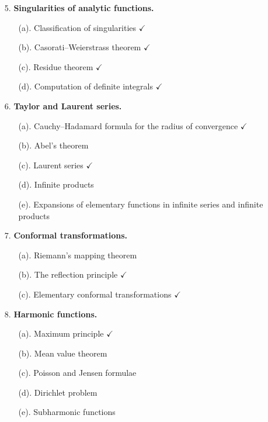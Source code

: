 \documentclass[11pt,a4paper]{article}
\theoremstyle{definition}
\begin{document}
\begin{enumerate}
\item[5.] \textbf{Singularities of analytic functions.}
  \begin{enumerate}
  \item[(a).] Classification of singularities $\checkmark$
  \item[(b).] Casorati--Weierstrass theorem $\checkmark$
  \item[(c).] Residue theorem $\checkmark$
  \item[(d).] Computation of definite integrals $\checkmark$
  \end{enumerate}

\item[6.] \textbf{Taylor and Laurent series.}
  \begin{enumerate}
  \item[(a).] Cauchy--Hadamard formula for the radius of convergence $\checkmark$
  \item[(b).] Abel's theorem
  \item[(c).] Laurent series $\checkmark$
  \item[(d).] Infinite products
  \item[(e).] Expansions of elementary functions in infinite series and infinite
  products
  \end{enumerate}

\item[7.] \textbf{Conformal transformations.}
  \begin{enumerate}
  \item[(a).] Riemann's mapping theorem
  \item[(b).] The reflection principle $\checkmark$
  \item[(c).] Elementary conformal transformations $\checkmark$
  \end{enumerate}

\item[8.] \textbf{Harmonic functions.}
  \begin{enumerate}
  \item[(a).] Maximum principle $\checkmark$
  \item[(b).] Mean value theorem
  \item[(c).] Poisson and Jensen formulae
  \item[(d).] Dirichlet problem
  \item[(e).] Subharmonic functions
  \end{enumerate}
\end{enumerate}
\end{document}
